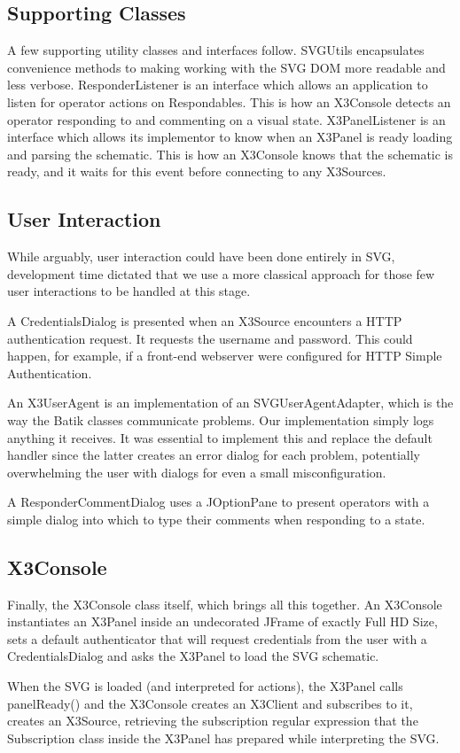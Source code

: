 \subsection{Supporting Classes}

A few supporting utility classes and interfaces follow. SVGUtils
encapsulates convenience methods to making
working with the SVG DOM more readable and less verbose. ResponderListener
is an interface which allows an application to listen for operator actions
on Respondables. This is how an X3Console detects an operator responding
to and commenting on a visual state. X3PanelListener is an interface
which allows its implementor to know when an X3Panel is ready loading and
parsing the schematic. This is how an X3Console knows that the schematic
is ready, and it waits for this event before connecting to any X3Sources.

\subsection{User Interaction}

While arguably, user interaction could have been done entirely in SVG,
development time dictated that we use a more classical approach for
those few user interactions to be handled at this stage.

A CredentialsDialog is presented when an X3Source encounters a HTTP
authentication request.  It requests the username and password. This
could happen, for example, if a front-end webserver were configured for
HTTP Simple Authentication.

An X3UserAgent  is an implementation of an SVGUserAgentAdapter, which
is the way the Batik classes communicate problems. Our implementation
simply logs anything it receives. It was essential to implement this and
replace the default handler since the latter creates an error dialog
for each problem, potentially overwhelming the user with dialogs for
even a small misconfiguration.

A ResponderCommentDialog uses a JOptionPane to present operators with
a simple dialog into which to type their comments when responding to
a state.

\subsection{X3Console}

Finally, the X3Console class itself, which brings all this together.
An X3Console instantiates an X3Panel inside an undecorated JFrame of
exactly Full HD Size, sets a default authenticator that will request
credentials from the user with a CredentialsDialog and asks the X3Panel to
load the SVG schematic.

When the SVG is loaded (and interpreted for actions), the X3Panel calls
panelReady() and the X3Console creates an X3Client and subscribes to it,
creates an X3Source, retrieving the subscription regular expression
that the Subscription class inside the X3Panel has prepared while
interpreting the SVG.
